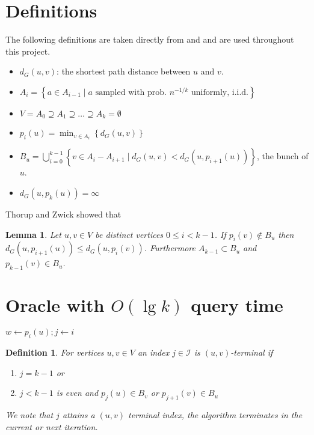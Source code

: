 \documentclass[12pt]{article}
\newtheorem{lem}[thm]{Lemma}
\newtheorem{defi}[thm]{Definition}
\begin{document}
\section{Definitions}
The following definitions are taken directly from \cite{Thorup2005} and \cite{Wulff2013} and are used throughout this project.
\begin{itemize}
\item $d_{G}(u,v)$: the shortest path distance between $u$ and $v$.
\item $A_i = \left\{ a \in A_{i-1} \; | \; a \text{ sampled with prob. } n^{-1/k} \text{ uniformly, i.i.d.} \right\}$
\item $V = A_0 \supseteq A_1 \supseteq \hdots \supseteq A_k = \emptyset$
\item $p_i(u) = \min_{v \in A_i} \left\{ d_{G}(u,v) \right\}$
\item $B_u=\bigcup_{i=0}^{k-1}\left\{ v \in A_i - A_{i+1} \; | \; d_{G}(u,v) < d_{G}(u, p_{i+1}(u)) \right\}$, the bunch of $u$.
\item $d_G(u,p_k(u))=\infty$
\end{itemize}
Thorup and Zwick showed that
\\
\begin{lem}
Let $u,v \in V$ be distinct vertices $0 \leq i < k-1$. If $p_i(v) \not\in B_{u}$ then $d_G(u, p_{i+1}(u)) \leq d_G(u, p_i(v))$. Furthermore $A_{k-1} \subset B_u$ and $p_{k-1}(v) \in B_u$. \label{lem:onedeltaperiteration}
\end{lem}

\section{Oracle with $O(\lg k)$ query time}
\begin{Walgo}[ht]{20pt}
  \DontPrintSemicolon
  \Indm
    \Indp
    \BlankLine
    $w \leftarrow p_i(u); j \leftarrow i$
    
    
    \caption{$dist_k(u,v,i)$}
    \label{alg:0.1}
\end{Walgo}

\begin{defi}
For vertices $u,v \in V$ an index $j \in \mathcal{I}$ is $(u,v)$-terminal if
\begin{enumerate}
\item $j = k-1$ or
\item $j < k-1$ is even and $p_j(u) \in B_v$ or $p_{j+1}(v) \in B_u$ 
\end{enumerate}
We note that $j$ attains a $(u,v)$ terminal index, the algorithm terminates in the current or next iteration.
\end{defi}
\end{document}
